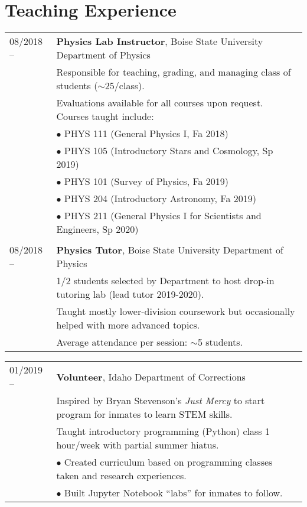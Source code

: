 \documentclass[11pt]{article}
\begin{document}
\section{Teaching Experience}
\begin{tabular}{ll}
08/2018 --		& 	\textbf{Physics Lab Instructor}, Boise State University Department of Physics \vspace{1mm} \\
      & Responsible for teaching, grading, and managing class of students ($\sim$25/class).\\
      & Evaluations available for all courses upon request. Courses taught include: \vspace{2mm} \\
      & $\bullet$ PHYS 111 (General Physics I, Fa 2018)\\
      & $\bullet$ PHYS 105 (Introductory Stars and Cosmology, Sp 2019)\\
      & $\bullet$ PHYS 101 (Survey of Physics, Fa 2019)\\
      & $\bullet$ PHYS 204 (Introductory Astronomy, Fa 2019)\\
      & $\bullet$ PHYS 211 (General Physics I for Scientists and Engineers, Sp 2020) \\
      & \\
08/2018 --    &   \textbf{Physics Tutor}, Boise State University Department of Physics \vspace{1mm} \\
      & 1/2 students selected by Department to host drop-in tutoring lab (lead tutor 2019-2020).\\
      & Taught mostly lower-division coursework but occasionally helped with more advanced topics.\\
      & Average attendance per session: $\sim$5 students.\\

\end{tabular}
\newpage
\begin{tabular}{ll}
01/2019 --    &   \textbf{Volunteer}, Idaho Department of Corrections \\
      & Inspired by Bryan Stevenson's \textit{Just Mercy} to start program for inmates to learn STEM skills.\vspace{2mm} \\
      & Taught introductory programming (Python) class 1 hour/week with partial summer hiatus.\\
      & $\bullet$ Created curriculum based on programming classes taken and research experiences.\\
      & $\bullet$ Built Jupyter Notebook ``labs'' for inmates to follow.
\end{tabular}
\end{document}

